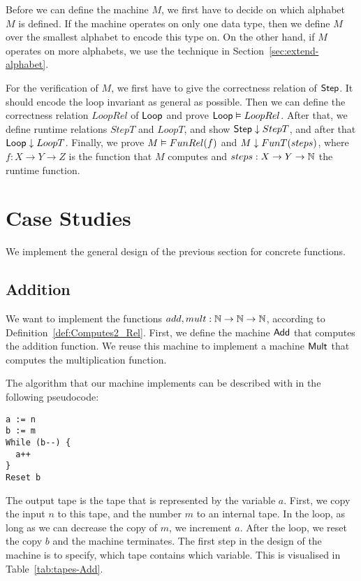Before we can define the machine $M$, we first have to decide on which alphabet $M$ is defined.  If the machine operates on only one data type, then
we define $M$ over the smallest alphabet to encode this type on.  On the other hand, if $M$ operates on more alphabets, we use the technique in
Section~\ref{sec:extend-alphabet}.

For the verification of $M$, we first have to give the correctness relation of $\mathsf{Step}$.  It should encode the loop invariant as general as
possible.  Then we can define the correctness relation $LoopRel$ of $\mathsf{Loop}$ and prove $\mathsf{Loop} \mathrel{\vDash} LoopRel$.  After that, we define runtime
relations $StepT$ and $LoopT$, and show $\mathsf{Step} \mathrel{\downarrow} StepT$, and after that $\mathsf{Loop} \mathrel{\downarrow} LoopT$.  Finally, we prove
$M \mathrel{\vDash} FunRel(f)$ and $M \mathrel{\downarrow} FunT(steps)$, where $f:X \to Y \to Z$ is the function that $M$ computes and $steps:X \rightarrow Y \rightarrow \mathbb{N}$ the
runtime function.


\section{Case Studies}
\label{sec:case-studies}

We implement the general design of the previous section for concrete functions.

\subsection{Addition}
\label{sec:Add}
%

We want to implement the functions $add,mult:\mathbb{N}\rightarrow\mathbb{N}\rightarrow\mathbb{N}$, according to Definition~\ref{def:Computes2_Rel}.  First, we define the machine
$\mathsf{Add}$ that computes the addition function.  We reuse this machine to implement a machine $\mathsf{Mult}$ that computes the multiplication function.

The algorithm that our machine implements can be described with in the following pseudocode:
{
  \small
\begin{lstlisting}[style=pseudocode]
a := n
b := m
While (b--) {
  a++
}
Reset b
\end{lstlisting}
}%
The output tape is the tape that is represented by the variable $a$.  First, we copy the input $n$ to this tape, and the number $m$ to an internal
tape.  In the loop, as long as we can decrease the copy of $m$, we increment $a$.  After the loop, we reset the copy $b$ and the machine terminates.
The first step in the design of the machine is to specify, which tape contains which variable.  This is visualised in Table~\ref{tab:tapes-Add}.

